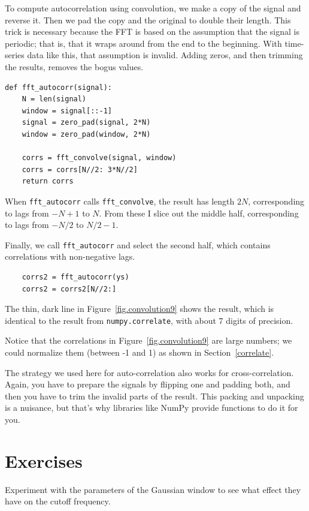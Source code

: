 \documentclass[12pt]{book}
\begin{document}
To compute autocorrelation using convolution, we make a copy of
the signal and reverse it.  Then we pad the copy and the original to
double their length.  This trick is necessary because the FFT is based
on the assumption that the signal is periodic; that is, that it wraps
around from the end to the beginning.  With time-series data like
this, that assumption is invalid.  Adding zeros, and then trimming 
the results, removes the bogus values.

\begin{verbatim}
def fft_autocorr(signal):
    N = len(signal)
    window = signal[::-1]
    signal = zero_pad(signal, 2*N)
    window = zero_pad(window, 2*N)

    corrs = fft_convolve(signal, window)
    corrs = corrs[N//2: 3*N//2]
    return corrs
\end{verbatim}

When \verb"fft_autocorr" calls \verb"fft_convolve", the result has
length $2N$, corresponding to lags from $-N+1$ to $N$.  From these I
slice out the middle half, corresponding to lags from $-N/2$ to
$N/2-1$.

Finally, we call \verb"fft_autocorr" and select the second half,
which contains correlations with non-negative lags.

\begin{verbatim}
    corrs2 = fft_autocorr(ys)
    corrs2 = corrs2[N//2:]
\end{verbatim}

The thin, dark line in Figure~\ref{fig.convolution9} shows the result,
which is identical to the result from {\tt numpy.correlate}, with
about 7 digits of precision.

Notice that the correlations in Figure~\ref{fig.convolution9} are
large numbers; we could normalize them (between -1 and 1) as shown
in Section~\ref{correlate}.

The strategy we used here for auto-correlation also works for
cross-correlation.  Again, you have to prepare the signals
by flipping one and padding both, and then you have to trim
the invalid parts of the result.  This packing and unpacking is
a nuisance, but that's why libraries like
NumPy provide functions to do it for you.


\section{Exercises}

\begin{exercise}
Experiment with the parameters of the Gaussian window to see
what effect they have on the cutoff frequency.
\end{exercise}
\end{document}
